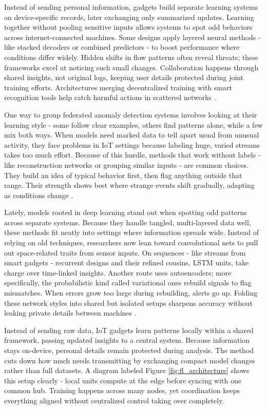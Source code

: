 \documentclass[12pt]{article}
\begin{document}
Instead of sending personal information, gadgets build separate learning systems on device-specific records, later exchanging only summarized updates. Learning together without pooling sensitive inputs allows systems to spot odd behaviors across internet-connected machines. Some designs apply layered neural methods - like stacked decoders or combined predictors - to boost performance where conditions differ widely. Hidden shifts in flow patterns often reveal threats; these frameworks excel at noticing such small changes. Collaboration happens through shared insights, not original logs, keeping user details protected during joint training efforts. Architectures merging decentralized training with smart recognition tools help catch harmful actions in scattered networks \cite{paper1,paper2,paper3}.

One way to group federated anomaly detection systems involves looking at their learning style - some follow clear examples, others find patterns alone, while a few mix both ways. When models need marked data to tell apart usual from unusual activity, they face problems in IoT settings because labeling huge, varied streams takes too much effort. Because of this hurdle, methods that work without labels - like reconstruction networks or grouping similar inputs - are common choices. They build an idea of typical behavior first, then flag anything outside that range. Their strength shows best where strange events shift gradually, adapting as conditions change \cite{paper3,paper5}.

Lately, models rooted in deep learning stand out when spotting odd patterns across separate systems. Because they handle tangled, multi-layered data well, these methods fit neatly into settings where information spreads wide. Instead of relying on old techniques, researchers now lean toward convolutional nets to pull out space-related traits from sensor inputs. On sequences - like streams from smart gadgets - recurrent designs and their refined cousins, LSTM units, take charge over time-linked insights. Another route uses autoencoders; more specifically, the probabilistic kind called variational ones rebuild signals to flag mismatches. When errors grow too large during rebuilding, alerts go up. Folding these network styles into shared but isolated setups sharpens accuracy without leaking private details between machines \cite{paper1,paper2}.

Instead of sending raw data, IoT gadgets learn patterns locally within a shared framework, passing updated insights to a central system. Because information stays on-device, personal details remain protected during analysis. The method cuts down how much needs transmitting by exchanging compact model changes rather than full datasets. A diagram labeled Figure \ref{fig:fl_architecture} shows this setup clearly - local units compute at the edge before syncing with one common hub. Training happens across many nodes, yet coordination keeps everything aligned without centralized control taking over completely.
\end{document}
